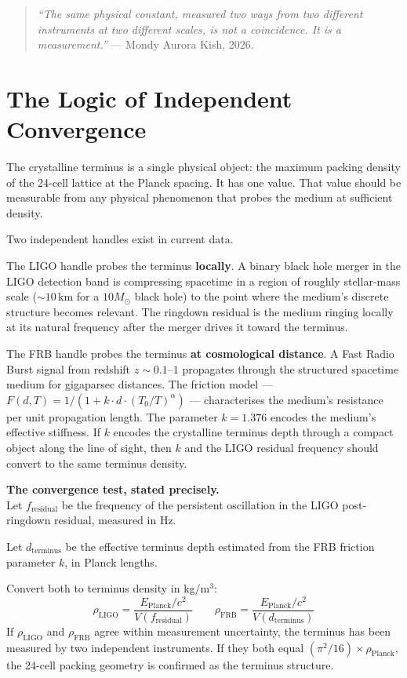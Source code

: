 \documentclass[11pt, letterpaper, openany]{book}
\begin{document}
\begin{quote}
\textit{``The same physical constant, measured two ways from two different
instruments at two different scales, is not a coincidence.
It is a measurement.''} --- Mondy Aurora Kish, 2026.
\end{quote}

\section{The Logic of Independent Convergence}

The crystalline terminus is a single physical object: the maximum packing
density of the 24-cell lattice at the Planck spacing. It has one value.
That value should be measurable from any physical phenomenon that probes
the medium at sufficient density.

Two independent handles exist in current data.

The LIGO handle probes the terminus \textbf{locally}. A binary black hole
merger in the LIGO detection band is compressing spacetime in a region of
roughly stellar-mass scale ($\sim 10\,\text{km}$ for a $10 M_\odot$ black hole)
to the point where the medium's discrete structure becomes relevant.
The ringdown residual is the medium ringing locally at its natural frequency
after the merger drives it toward the terminus.

The FRB handle probes the terminus \textbf{at cosmological distance}.
A Fast Radio Burst signal from redshift $z \sim 0.1$--$1$ propagates through
the structured spacetime medium for gigaparsec distances. The friction model
--- $F(d,T) = 1/(1 + k \cdot d \cdot (T_0/T)^\alpha)$ --- characterises
the medium's resistance per unit propagation length. The parameter $k = 1.376$
encodes the medium's effective stiffness. If $k$ encodes the crystalline
terminus depth through a compact object along the line of sight, then
$k$ and the LIGO residual frequency should convert to the same terminus
density.

\begin{signalbox}
\textbf{The convergence test, stated precisely.}\\[0.5em]
Let $f_\text{residual}$ be the frequency of the persistent oscillation
in the LIGO post-ringdown residual, measured in Hz.

Let $d_\text{terminus}$ be the effective terminus depth estimated from
the FRB friction parameter $k$, in Planck lengths.

Convert both to terminus density in kg/m$^3$:
\[
\rho_\text{LIGO} = \frac{E_\text{Planck}/c^2}{V(f_\text{residual})}
\qquad
\rho_\text{FRB} = \frac{E_\text{Planck}/c^2}{V(d_\text{terminus})}
\]
If $\rho_\text{LIGO}$ and $\rho_\text{FRB}$ agree within measurement
uncertainty, the terminus has been measured by two independent instruments.
If they both equal $(\pi^2/16) \times \rho_\text{Planck}$, the 24-cell
packing geometry is confirmed as the terminus structure.
\end{signalbox}
\end{document}
